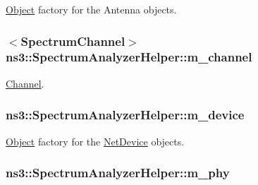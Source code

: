 \hyperlink{classns3_1_1Object}{Object} factory for the Antenna objects. 

\subsubsection[{\texorpdfstring{m\+\_\+channel}{m_channel}}]{$<${\bf Spectrum\+Channel}$>$ ns3\+::\+Spectrum\+Analyzer\+Helper\+::m\+\_\+channel\hspace{0.3cm}{\ttfamily [private]}}\hypertarget{classns3_1_1SpectrumAnalyzerHelper_aed344c92a7114c00966bdab699c01c8a}{}\label{classns3_1_1SpectrumAnalyzerHelper_aed344c92a7114c00966bdab699c01c8a}


\hyperlink{classns3_1_1Channel}{Channel}. 

\subsubsection[{\texorpdfstring{m\+\_\+device}{m_device}}]{ ns3\+::\+Spectrum\+Analyzer\+Helper\+::m\+\_\+device\hspace{0.3cm}{\ttfamily [private]}}\hypertarget{classns3_1_1SpectrumAnalyzerHelper_af3f584284b42fb8225ba300448592640}{}\label{classns3_1_1SpectrumAnalyzerHelper_af3f584284b42fb8225ba300448592640}


\hyperlink{classns3_1_1Object}{Object} factory for the \hyperlink{classns3_1_1NetDevice}{Net\+Device} objects. 

\subsubsection[{\texorpdfstring{m\+\_\+phy}{m_phy}}]{ ns3\+::\+Spectrum\+Analyzer\+Helper\+::m\+\_\+phy\hspace{0.3cm}{\ttfamily [private]}}\hypertarget{classns3_1_1SpectrumAnalyzerHelper_a10d772392b256780b85f4c70e3232871}{}\label{classns3_1_1SpectrumAnalyzerHelper_a10d772392b256780b85f4c70e3232871}


